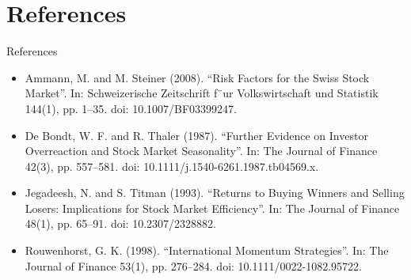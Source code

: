 \documentclass[10pt]{beamer}
\begin{document}
\section{References}
\begin{frame}{References}

\begin{itemize}
    \item Ammann, M. and M. Steiner (2008). “Risk Factors for the Swiss Stock
Market”. In: Schweizerische Zeitschrift f¨ur Volkswirtschaft und Statistik
144(1), pp. 1–35. doi: 10.1007/BF03399247.
    \item De Bondt, W. F. and R. Thaler (1987). “Further Evidence on Investor
Overreaction and Stock Market Seasonality”. In: The Journal of Finance
42(3), pp. 557–581. doi: 10.1111/j.1540-6261.1987.tb04569.x.
    \item Jegadeesh, N. and S. Titman (1993). “Returns to Buying Winners and Selling Losers: Implications for Stock Market Efficiency”. In: The Journal of Finance 48(1), pp. 65–91. doi: 10.2307/2328882.
    \item Rouwenhorst, G. K. (1998). “International Momentum Strategies”. In: The Journal of Finance 53(1), pp. 276–284. doi: 10.1111/0022-1082.95722.

    
\end{itemize}
\end{frame}
\end{document}
